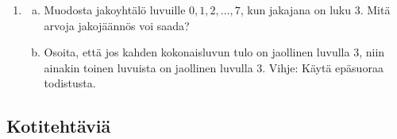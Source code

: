 \begin{enumerate}

\item
\begin{enumerate}[a)]
\item Muodosta jakoyhtälö luvuille $0, 1, 2, \ldots, 7$, kun jakajana on luku $3$. Mitä arvoja jakojäännös voi saada?
\item Osoita, että jos kahden kokonaisluvun tulo on jaollinen luvulla $3$, niin ainakin toinen luvuista on jaollinen luvulla $3$. Vihje: Käytä epäsuoraa todistusta.
\end{enumerate}

\end{enumerate}

\subsection*{Kotitehtäviä}

